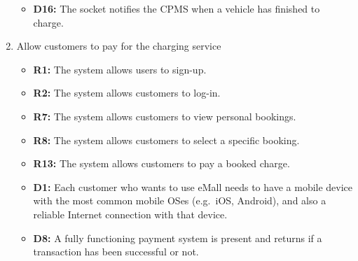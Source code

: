 \begin{enumerate}[label=\textbf{-G\arabic*}:]
{\begin{itemize}
            \item \textbf{D16:} The socket notifies the CPMS when a vehicle has finished to charge.
          \end{itemize}
          }
    \item {Allow customers to pay for the charging service
          \begin{itemize}
            \item \textbf{R1:} The system allows users to sign-up.
            \item \textbf{R2:} The system allows customers to log-in.
            \item \textbf{R7:} The system allows customers to view personal bookings.
            \item \textbf{R8:} The system allows customers to select a specific booking.
            \item \textbf{R13:} The system allows customers to pay a booked charge.
            \item \textbf{D1:} Each customer who wants to use eMall needs to have a mobile device with the most common mobile OSes (e.g.\ iOS, Android), and also a reliable Internet connection with that device.
            \item \textbf{D8:} A fully functioning payment system is present and returns if a transaction has been successful or not.
              
          \end{itemize}
          }
    

\end{enumerate}
